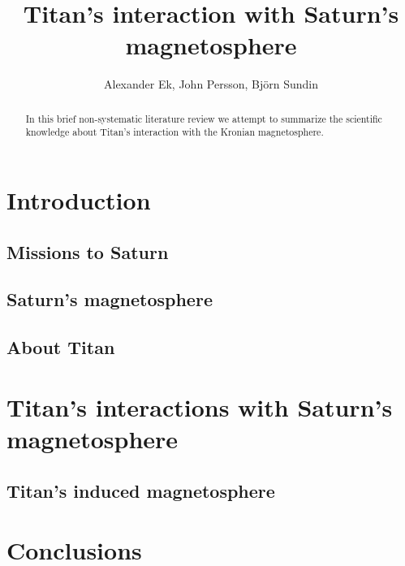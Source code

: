 \documentclass[12pt, parskip=full*, abstract]{scrartcl}
\title{Titan's interaction with Saturn's magnetosphere}
\author{Alexander Ek, John Persson, Björn Sundin}
\begin{document}
\maketitle
\vspace{5mm}
\begin{abstract}
	In this brief non-systematic literature review we attempt to summarize the scientific knowledge about Titan's interaction with the Kronian magnetosphere.
\end{abstract}

\tableofcontents
\newpage

\section{Introduction}
\subsection{Missions to Saturn}

\subsection{Saturn's magnetosphere}

\subsection{About Titan}


\section{Titan's interactions with Saturn's magnetosphere}

\subsection{Titan's induced magnetosphere}


\parencite{solar-system-magnetospheres}
\parencite{encyclopedia}

 

\section{Conclusions}

\newpage
\printbibliography
\end{document}
